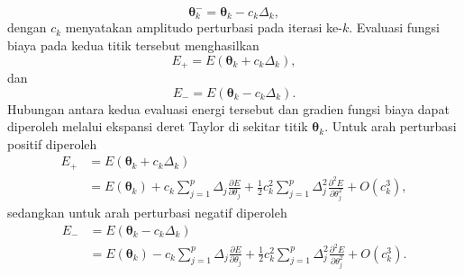 \begin{equation}
\boldsymbol{\theta}_k^{-}
=
\boldsymbol{\theta}_k
-
c_k \Delta_k,
\end{equation}
dengan $c_k$ menyatakan amplitudo perturbasi pada iterasi ke-$k$. Evaluasi fungsi biaya pada kedua titik tersebut menghasilkan
\begin{equation}
E_+
=
E(\boldsymbol{\theta}_k+c_k\Delta_k),
\end{equation}
dan
\begin{equation}
E_-
=
E(\boldsymbol{\theta}_k-c_k\Delta_k).
\end{equation}
Hubungan antara kedua evaluasi energi tersebut dan gradien fungsi biaya dapat diperoleh melalui ekspansi deret Taylor di sekitar titik $\boldsymbol{\theta}_k$. Untuk arah perturbasi positif diperoleh
\begin{equation}
\begin{split}
E_+
&=
E(\boldsymbol{\theta}_k+c_k\Delta_k)
\\
&=
E(\boldsymbol{\theta}_k)
+
c_k
\sum_{j=1}^{p}
\Delta_j
\frac{\partial E}{\partial \theta_j}
+
\frac{1}{2}c_k^2
\sum_{j=1}^{p}
\Delta_j^2
\frac{\partial^2 E}{\partial \theta_j^2}
+
O(c_k^3),
\end{split}
\label{eq:spsa_taylor_plus}
\end{equation}
sedangkan untuk arah perturbasi negatif diperoleh
\begin{equation}
\begin{split}
E_-
&=
E(\boldsymbol{\theta}_k-c_k\Delta_k)
\\
&=
E(\boldsymbol{\theta}_k)
-
c_k
\sum_{j=1}^{p}
\Delta_j
\frac{\partial E}{\partial \theta_j}
+
\frac{1}{2}c_k^2
\sum_{j=1}^{p}
\Delta_j^2
\frac{\partial^2 E}{\partial \theta_j^2}
+
O(c_k^3).
\end{split}
\label{eq:spsa_taylor_minus}
\end{equation}

